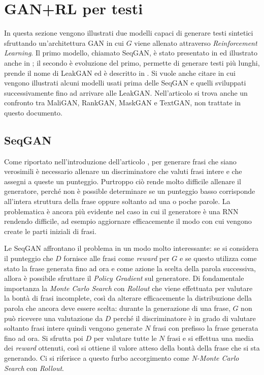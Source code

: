 

\section{GAN+RL per testi}
In questa sezione vengono illustrati due modelli capaci di generare testi sintetici sfruttando un'architettura GAN in cui $G$ viene allenato attraverso \emph{Reinforcement Learning}.
Il primo modello, chiamato SeqGAN, è stato presentato in \cite{SeqGAN} ed illustrato anche in \cite{GAN_for_text}; il secondo è evoluzione del primo, permette di generare testi più lunghi, prende il nome di LeakGAN ed è descritto in \cite{LeakGAN}.
Si vuole anche citare \cite{NetTextGen_Review} in cui vengono illustrati alcuni modelli usati prima delle SeqGAN e quelli sviluppati successivamente fino ad arrivare alle LeakGAN.
Nell'articolo si trova anche un confronto tra MaliGAN, RankGAN, MaskGAN e TextGAN, non trattate in questo documento.

\subsection{SeqGAN}
Come riportato nell'introduzione dell'articolo \cite{SeqGAN}, per generare frasi che siano verosimili è necessario allenare un discriminatore che valuti frasi intere e che assegni a queste un punteggio.
Purtroppo ciò rende molto difficile allenare il generatore, perché non è possible determinare se un punteggio basso corrisponde all'intera struttura della frase oppure soltanto ad una o poche parole.
La problematica è ancora più evidente nel caso in cui il generatore è una RNN%
rendendo difficile, ad esempio aggiornare efficacemente il modo con cui vengono create le parti iniziali di frasi.

Le SeqGAN affrontano il problema in un modo molto interessante: se si considera il punteggio che $D$ fornisce alle frasi come \emph{reward} per $G$ e se questo utilizza come stato la frase generata fino ad ora e come azione la scelta della parola successiva, allora è possibile sfruttare il \emph{Policy Gradient} sul generatore.
Di fondamentale importanza la \emph{Monte Carlo Search} con \emph{Rollout} che viene effettuata per valutare la bontà di frasi incomplete, così da alterare efficacemente la distribuzione della parola che ancora deve essere scelta: 
durante la generazione di una frase, $G$ non può ricevere una valutazione da $D$ perché il discriminatore è in grado di valutare soltanto frasi intere %
quindi vengono generate $N$ frasi con prefisso la frase generata fino ad ora.
Si sfrutta poi $D$ per valutare tutte le $N$ frasi e si effettua una media dei \emph{reward} ottenuti, così si ottiene il valore atteso della bontà della frase che si sta generando.
Ci si riferisce a questo furbo accorgimento come \emph{N-Monte Carlo Search} con \emph{Rollout}.

